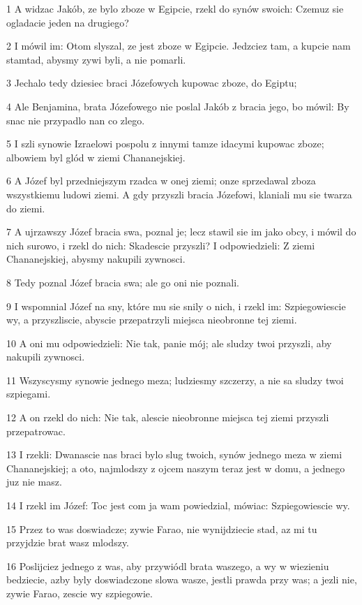 \par 1 A widzac Jakób, ze bylo zboze w Egipcie, rzekl do synów swoich: Czemuz sie ogladacie jeden na drugiego?
\par 2 I mówil im: Otom slyszal, ze jest zboze w Egipcie. Jedzciez tam, a kupcie nam stamtad, abysmy zywi byli, a nie pomarli.
\par 3 Jechalo tedy dziesiec braci Józefowych kupowac zboze, do Egiptu;
\par 4 Ale Benjamina, brata Józefowego nie poslal Jakób z bracia jego, bo mówil: By snac nie przypadlo nan co zlego.
\par 5 I szli synowie Izraelowi pospolu z innymi tamze idacymi kupowac zboze; albowiem byl glód w ziemi Chananejskiej.
\par 6 A Józef byl przedniejszym rzadca w onej ziemi; onze sprzedawal zboza wszystkiemu ludowi ziemi. A gdy przyszli bracia Józefowi, klaniali mu sie twarza do ziemi.
\par 7 A ujrzawszy Józef bracia swa, poznal je; lecz stawil sie im jako obcy, i mówil do nich surowo, i rzekl do nich: Skadescie przyszli? I odpowiedzieli: Z ziemi Chananejskiej, abysmy nakupili zywnosci.
\par 8 Tedy poznal Józef bracia swa; ale go oni nie poznali.
\par 9 I wspomnial Józef na sny, które mu sie snily o nich, i rzekl im: Szpiegowiescie wy, a przyszliscie, abyscie przepatrzyli miejsca nieobronne tej ziemi.
\par 10 A oni mu odpowiedzieli: Nie tak, panie mój; ale sludzy twoi przyszli, aby nakupili zywnosci.
\par 11 Wszyscysmy synowie jednego meza; ludziesmy szczerzy, a nie sa sludzy twoi szpiegami.
\par 12 A on rzekl do nich: Nie tak, alescie nieobronne miejsca tej ziemi przyszli przepatrowac.
\par 13 I rzekli: Dwanascie nas braci bylo slug twoich, synów jednego meza w ziemi Chananejskiej; a oto, najmlodszy z ojcem naszym teraz jest w domu, a jednego juz nie masz.
\par 14 I rzekl im Józef: Toc jest com ja wam powiedzial, mówiac: Szpiegowiescie wy.
\par 15 Przez to was doswiadcze; zywie Farao, nie wynijdziecie stad, az mi tu przyjdzie brat wasz mlodszy.
\par 16 Poslijciez jednego z was, aby przywiódl brata waszego, a wy w wiezieniu bedziecie, azby byly doswiadczone slowa wasze, jestli prawda przy was; a jezli nie, zywie Farao, zescie wy szpiegowie.
